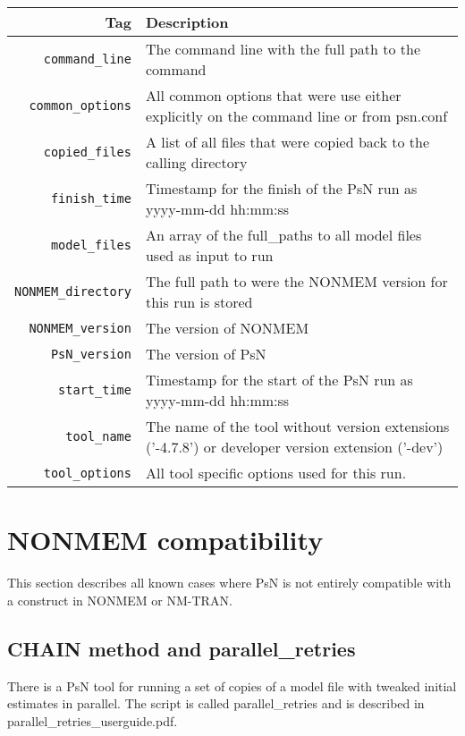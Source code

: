 	\begin{center}
		\begin{tabularx}{\linewidth}{ r X }
			\hline
			Tag & Description \\ \hline
			\verb|command_line| & The command line with the full path to the command \\ \hline
			\verb|common_options| & All common options that were use either explicitly on the command line or from psn.conf \\ \hline
			\verb|copied_files| & A list of all files that were copied back to the calling directory \\ \hline
			\verb|finish_time| & Timestamp for the finish of the PsN run as yyyy-mm-dd hh:mm:ss \\ \hline
			\verb|model_files| & An array of the full\_paths to all model files used as input to run \\ \hline
			\verb|NONMEM_directory| & The full path to were the NONMEM version for this run is stored \\ \hline
			\verb|NONMEM_version| & The version of NONMEM \\ \hline
			\verb|PsN_version| & The version of PsN \\ \hline
			\verb|start_time| & Timestamp for the start of the PsN run as yyyy-mm-dd hh:mm:ss \\ \hline
			\verb|tool_name| & The name of the tool without version extensions \mbox{('-4.7.8')} or developer version extension ('-dev') \\ \hline
			\verb|tool_options| & All tool specific options used for this run. \\ \hline
		\end{tabularx}
	\end{center}
	
	
	
	\section{NONMEM compatibility}
	
	This section describes all known cases where PsN is not entirely compatible with a construct in NONMEM or NM-TRAN.

	\subsection{CHAIN method and parallel\_retries}
	
	There is a PsN tool for running a set of copies of a model file with tweaked initial estimates in parallel. The script is called parallel\_retries and is described in parallel\_retries\_userguide.pdf.
	
